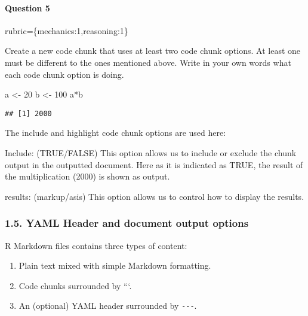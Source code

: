 \documentclass[
]{article}
\newenvironment{Shaded}{\begin{snugshade}}{\end{snugshade}}
\newcommand{\DecValTok}[1]{\textcolor[rgb]{0.00,0.00,0.81}{#1}}
\newcommand{\NormalTok}[1]{#1}
\newcommand{\OtherTok}[1]{\textcolor[rgb]{0.56,0.35,0.01}{#1}}
\newcommand{\SpecialCharTok}[1]{\textcolor[rgb]{0.00,0.00,0.00}{#1}}
\providecommand{\tightlist}{%
  \setlength{\itemsep}{0pt}\setlength{\parskip}{0pt}}
\begin{document}
\begin{alert alert-info}
\hypertarget{question-5}{%
\paragraph{Question 5}\label{question-5}}

rubric=\{mechanics:1,reasoning:1\}

Create a new code chunk that uses at least two code chunk options. At
least one must be different to the ones mentioned above. Write in your
own words what each code chunk option is doing.
\end{alert alert-info}

\begin{Shaded}
\begin{Highlighting}[]
\NormalTok{a }\OtherTok{\textless{}{-}} \DecValTok{20}
\NormalTok{b }\OtherTok{\textless{}{-}} \DecValTok{100}
\NormalTok{a}\SpecialCharTok{*}\NormalTok{b}
\end{Highlighting}
\end{Shaded}

\begin{verbatim}
## [1] 2000
\end{verbatim}

The include and highlight code chunk options are used here:

Include: (TRUE/FALSE) This option allows us to include or exclude the
chunk output in the outputted document. Here as it is indicated as TRUE,
the result of the multiplication (2000) is shown as output.

results: (markup/asis) This option allows us to control how to display
the results.

\hypertarget{yaml-header-and-document-output-options}{%
\subsubsection{1.5. YAML Header and document output
options}\label{yaml-header-and-document-output-options}}

R Markdown files contains three types of content:

\begin{enumerate}
\def\labelenumi{\arabic{enumi}.}
\tightlist
\item
  Plain text mixed with simple Markdown formatting.
\item
  Code chunks surrounded by ```.
\item
  An (optional) YAML header surrounded by \texttt{-\/-\/-}.
\end{enumerate}
\end{document}
